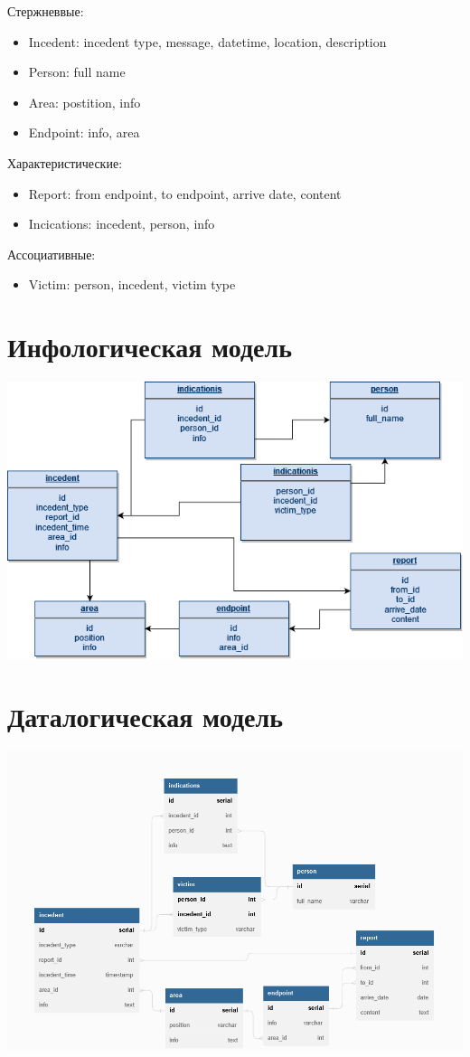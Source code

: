 \documentclass{article}
\begin{document}
Стержневвые:
\begin{itemize}
  \item Incedent: incedent type, message, datetime, location, description
  \item Person: full name
  \item Area: postition, info
  \item Endpoint: info, area
\end{itemize}
Характеристические:
\begin{itemize}
  \item Report: from endpoint, to endpoint, arrive date, content
  \item Incications: incedent, person, info
\end{itemize}
Ассоциативные:
\begin{itemize}
  \item Victim: person, incedent, victim type
\end{itemize}

\section{Инфологическая модель}
\begin{center}
  \includegraphics[scale=0.6]{infodiagram.png}
\end{center}

\section{Даталогическая модель}
\includegraphics[width=\textwidth]{dbdiagram.png}
\end{document}
